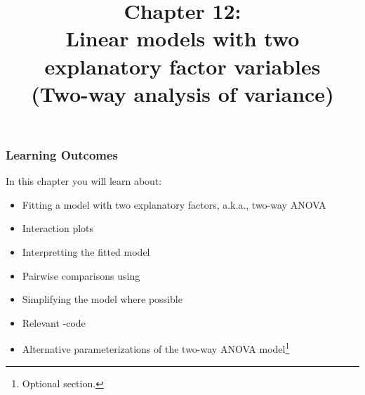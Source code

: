 \documentclass{beamer}\usepackage[]{graphicx}\usepackage[]{xcolor}
\begin{document}
\newcommand{\thechapter}{12}




\title{Chapter \thechapter: \\ Linear models with two explanatory factor variables \\ (Two-way analysis of variance)}




\begin{frame}
\titlepage
\end{frame}



\begin{frame}[t]
\frametitle{Learning Outcomes}
In this chapter you will learn about:
\begin{center}
\vspace{16pt}
  \begin{itemize}
  \item Fitting a model with two explanatory factors, a.k.a., two-way ANOVA
  \item Interaction plots
  \item Interpretting the fitted model
  \item Pairwise comparisons using 
  \item Simplifying the model where possible
  \item Relevant -code
  \item Alternative parameterizations of the two-way ANOVA model\footnote{Optional section.}
  \end{itemize}
\end{center}
\end{frame}





\end{document}
